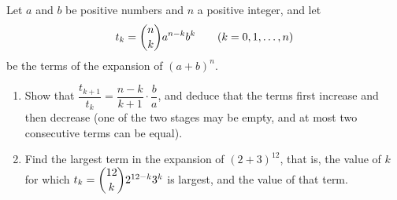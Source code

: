 Let $a$ and $b$ be positive numbers and $n$ a positive integer, and let
\[
t_k=\dbinom{n}{k}a^{n-k}b^k\qquad(k=0,1,\dots,n)
\]
be the terms of the expansion of $(a+b)^n$.
\begin{enumerate}
\item[(a)] Show that $\dfrac{t_{k+1}}{t_k}=\dfrac{n-k}{k+1}\cdot\dfrac{b}{a}$, and deduce that the terms first increase and then decrease (one of the two stages may be empty, and at most two consecutive terms can be equal).
\item[(b)] Find the largest term in the expansion of $(2+3)^{12}$, that is, the value of $k$ for which $t_k=\dbinom{12}{k}2^{12-k}3^k$ is largest, and the value of that term.
\end{enumerate}
